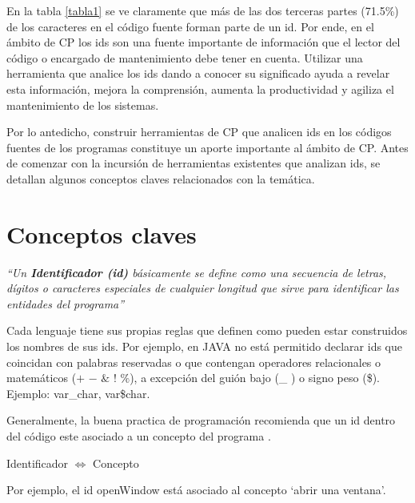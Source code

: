 \vspace{-2.5em}

En la tabla \ref{tabla1} se ve claramente que más de las dos terceras partes (71.5\%) de los caracteres en el código fuente forman parte de un id. 
Por ende, en el ámbito de CP los ids son una fuente importante de información que el lector del código o encargado de mantenimiento debe tener en cuenta. Utilizar una herramienta que analice los ids dando a conocer su significado ayuda a revelar esta información, mejora la comprensión, aumenta la productividad y agiliza el mantenimiento de los sistemas.

Por lo antedicho, construir herramientas de CP que analicen ids en los códigos fuentes de los programas constituye un aporte importante al ámbito de CP. Antes de comenzar con la incursión de herramientas existentes que analizan ids, se detallan algunos conceptos claves relacionados con la temática.

\section{Conceptos claves}

\textit{“Un \textbf{Identificador (id)} básicamente se define como una secuencia de letras, dígitos o caracteres especiales de cualquier longitud que sirve para identificar las entidades del programa”}
 
Cada lenguaje tiene sus propias reglas que definen como pueden estar construidos los nombres de sus ids. Por ejemplo, en JAVA no está permitido declarar ids que coincidan con palabras reservadas o que contengan operadores relacionales o matemáticos ($+$ $-$ $\&$ $!$ $\%$), a excepción del guión bajo (\_ ) o signo peso (\$). Ejemplo: \textsf{var\_char, var\$char}.

Generalmente, la buena practica de programación recomienda que un id dentro del código este asociado a un concepto del programa \cite{DFPM05,DMDJ13,LDFHB07}. 

\begin{center}
\textsf{Identificador $\Leftrightarrow$ Concepto}
\end{center}

Por ejemplo, el id \textsf{openWindow} está asociado al concepto `abrir una ventana'.

